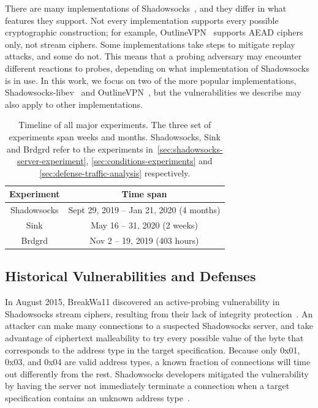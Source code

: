 \documentclass[sigconf,letterpaper]{acmart}
\begin{document}
There are many implementations of Shadowsocks~\cite{shadowsocks-libev, outline, shadowsocks-python, shadowsocks-rust, go-shadowsocks2, shadowsocksr-csharp},
and they differ in what features they support.
Not every implementation supports every possible cryptographic construction;
for example,
OutlineVPN~\cite{outline} supports AEAD ciphers only, not stream ciphers.
Some implementations take steps to mitigate replay attacks, and some do not.
This means that a probing adversary may encounter different reactions to probes,
depending on what implementation of Shadowsocks is in use.
In this work,
we focus on two of the more popular implementations,
Shadowsocks-libev~\cite{shadowsocks-libev} and OutlineVPN~\cite{outline},
but the vulnerabilities we describe
may also apply to other implementations.

\begin{table}
    \caption{Timeline of all major experiments. The three set of experiments span weeks and months. Shadowsocks, Sink and Brdgrd refer to the experiments in~\autoref{sec:shadowsocks-server-experiment}, \autoref{sec:conditions-experiments} and \autoref{sec:defense-traffic-analysis} respectively.}
    \label{table:time-span}
    \begin{tabular}{c|c}
      Experiment    & Time span                                 \\ \hline
      Shadowsocks & Sept 29, 2019 -- Jan 21, 2020 (4 months) \\
      Sink & May 16 -- 31, 2020 (2 weeks)    \\
      Brdgrd      & Nov 2 -- 19, 2019 (403 hours)   \\
    \end{tabular}
\end{table}

\subsection{Historical Vulnerabilities and Defenses}
\label{sec:historical-vulns}

In August 2015,
BreakWa11 discovered an active-probing vulnerability in Shadowsocks stream ciphers,
resulting from their lack of integrity protection~\cite{BreakWa112015, Fifield2017-summary}.
An attacker can make many connections to a suspected Shadowsocks server,
and take advantage of ciphertext malleability
to try every possible value of the byte that corresponds to the
address type in the target specification.
Because only 0x01, 0x03, and 0x04 are valid address types,
a known fraction of connections will time out differently from the rest.
Shadowsocks developers mitigated the vulnerability by
having the server not immediately terminate a connection when
a target specification contains an unknown address type~\cite{madeye-timeout}.
\end{document}
